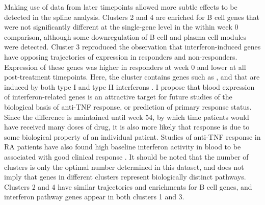 Making use of data from later timepoints allowed more subtle effects to be detected in the spline analysis.
Clusters 2 and 4 are enriched for B cell genes that were not significantly different at the single-gene level in the within week 0 comparison,
although some downregulation of B cell and plasma cell modules were detected.
Cluster 3 reproduced the observation that interferon-induced genes have opposing trajectories of expression in responders and non-responders.
Expression of these genes was higher in responders at week 0 and lower at all post-treatment timepoints.
Here, the cluster contains genes such as ,  and  that are induced by both type I and type II interferons \autocite{liu2012SystematicIdentificationType}.
I propose that blood expression of interferon-related genes is an attractive target for future studies of the biological basis of anti-\gls{TNF} response,
or prediction of primary response status.
Since the difference is maintained until week 54, by which time patients would have received many doses of drug,
it is also more likely that response is due to some biological property of an individual patient.
Studies of anti-\gls{TNF} response in \gls{RA} patients have also 
found high baseline interferon activity in blood to be associated with good clinical response \autocite{mavragani2010AssociationResponseTumor,wright2015InterferonGeneExpression}.
%
It should be noted that the number of clusters is only the optimal number determined in this dataset,
and does not imply that genes in different clusters represent biologically distinct pathways.
Clusters 2 and 4 have similar trajectories and enrichments for B cell genes,
and interferon pathway genes appear in both clusters 1 and 3.

